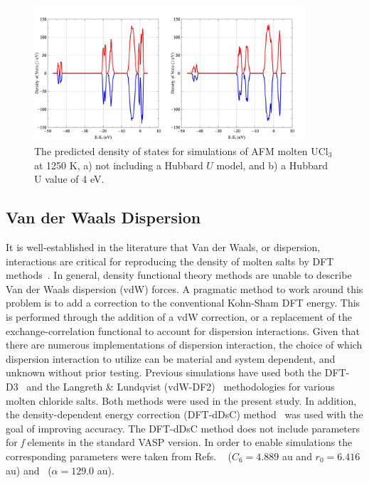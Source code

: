 \documentclass[preprint,3p,10pt,onecolumn,number,sort&compress]{elsarticle}
\begin{document}
{\begin{figure}[h]
\centering
\includegraphics[width=0.9\textwidth]{fig3.jpg}
\caption{The predicted density of states for simulations of AFM molten UCl$_3$ at 1250 K, a) not including a Hubbard $U$ model, and b) a Hubbard U value of 4 eV.} 
\label{fig:DOS}
\end{figure}


\subsection{Van der Waals Dispersion}

It is well-established in the literature that Van der Waals, or dispersion, interactions are critical for reproducing the density of molten salts by DFT methods~\cite{Li,Nam2014,Nam2015}. In general, density functional theory methods are unable to describe Van der Waals dispersion (vdW) forces. A pragmatic method to work around this problem is to add a correction to the conventional Kohn-Sham DFT energy. This is performed through the addition of a vdW correction, or a replacement of the exchange-correlation functional to account for dispersion interactions. Given that there are numerous implementations of dispersion interaction, the choice of which dispersion interaction to utilize can be material and system dependent, and unknown without prior testing. Previous simulations have used both the DFT-D3~\cite{Li,Grimme} and the Langreth \& Lundqvist (vdW-DF2)~\cite{Nam2015,Dion,Klimes} methodologies for various molten chloride salts. Both methods were used in the present study. In addition, the density-dependent energy correction (DFT-dDsC) method~\cite{Steinmann2011,Steinmann2} was used with the goal of improving accuracy. The DFT-dDsC method does not include parameters for \textit{f} elements in the standard VASP version. In order to enable simulations the corresponding parameters were taken from Refs. ~\cite{Kim} ($C_6=4.889$ au and $r_0=6.416$ au) and~\cite{pol} ($\alpha=129.0$ au). %

}
\end{document}
